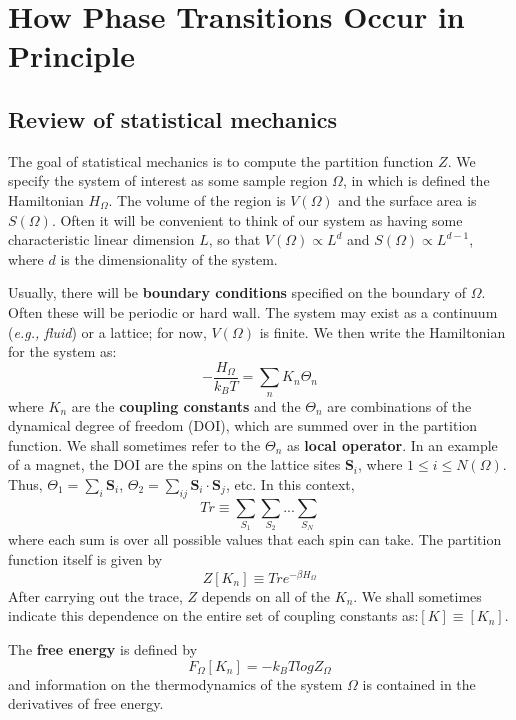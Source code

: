 \documentclass[12pt,titlepage]{article}
\numberwithin{equation}{section}
\begin{document}
\section{How Phase Transitions Occur in Principle}
\subsection{Review of statistical mechanics}
The goal of statistical mechanics is to compute the partition function $Z$. We specify the system of interest as some sample region $\Omega$, in which is defined the Hamiltonian $H_{\Omega}$. The volume of the region is $V(\Omega)$ and the surface area is $S(\Omega)$. Often it will be convenient to think of our system as having some characteristic linear dimension $L$, so that $V(\Omega)\propto L^d$ and $S(\Omega)\propto L^{d-1}$, where $d$ is the dimensionality of the system.

Usually, there will be \textbf{boundary conditions} specified on the boundary of $\Omega$. Often these will be periodic or hard wall. The system may exist as a continuum (\emph{e.g., fluid}) or a lattice; for now, $V(\Omega)$ is finite. We then write the Hamiltonian for the system as:
\begin{equation}
    -\frac{H_{\Omega}}{k_BT}=\sum_nK_n\Theta_n
\end{equation}
where $K_n$ are the \textbf{coupling constants} and the $\Theta_n$ are combinations of the dynamical degree of freedom (DOI), which are summed over in the partition function. We shall sometimes refer to the $\Theta_n$ as \textbf{local operator}. In an example of a magnet, the DOI are the spins on the lattice sites $\boldsymbol{S}_i$, where $1\leq i \leq N(\Omega)$. Thus, $\Theta_1=\sum_i\boldsymbol{S}_i$, $\Theta_2=\sum_{ij}\boldsymbol{S}_i\cdot\boldsymbol{S}_j$, etc. In this context, 
\begin{equation}
    Tr\equiv\sum_{S_1}\sum_{S_2}...\sum_{S_N}
\end{equation}
where each sum is over all possible values that each spin can take. The partition function itself is given by
\begin{equation}
    Z[{K_n}]\equiv Tr e^{-\beta H_{\Omega}}
\end{equation}
After carrying out the trace, $Z$ depends on all of the $K_n$. We shall sometimes indicate this dependence on the entire set of coupling constants as:$[K]\equiv[{K_n}]$.

The \textbf{free energy} is defined by
\begin{equation}
    F_{\Omega}[{K_n}] = -k_BT log Z_{\Omega}
\end{equation}
and information on the thermodynamics of the system $\Omega$ is contained in the derivatives of free energy.
\end{document}
